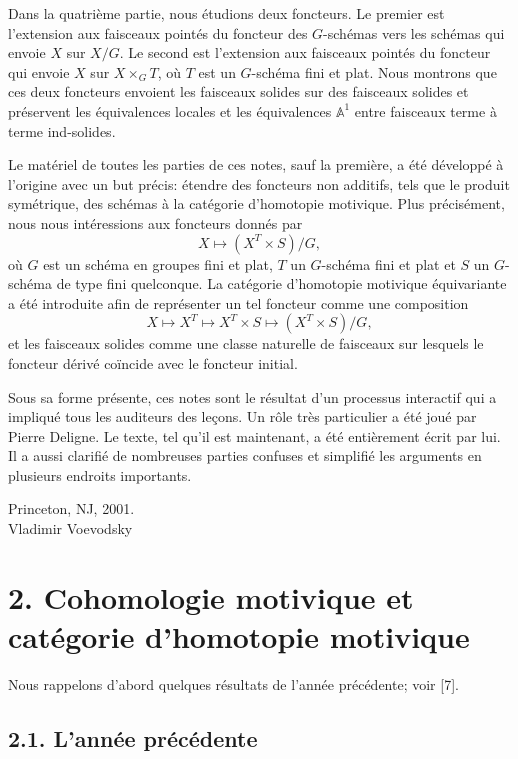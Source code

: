 \documentclass[11pt]{article}
\newcommand{\Aone}{\mathbb A^1}
\theoremstyle{deligne}
\begin{document}
Dans la quatrième partie, nous étudions deux foncteurs. Le premier est l'extension aux faisceaux pointés du foncteur des \(G\)-schémas vers les schémas qui envoie \(X\) sur \(X/G\). Le second est l'extension aux faisceaux pointés du foncteur qui envoie \(X\) sur \(X\times_G T\), où \(T\) est un \(G\)-schéma fini et plat. Nous montrons que ces deux foncteurs envoient les faisceaux solides sur des faisceaux solides et préservent les équivalences locales et les équivalences \(\Aone\) entre faisceaux terme à terme ind-solides.

Le matériel de toutes les parties de ces notes, sauf la première, a été développé à l'origine avec un but précis: étendre des foncteurs non additifs, tels que le produit symétrique, des schémas à la catégorie d'homotopie motivique. Plus précisément, nous nous intéressions aux foncteurs donnés par
\[
  X\longmapsto (X^T\times S)/G,
\]
où \(G\) est un schéma en groupes fini et plat, \(T\) un \(G\)-schéma fini et plat et \(S\) un \(G\)-schéma de type fini quelconque. La catégorie d'homotopie motivique équivariante a été introduite afin de représenter un tel foncteur comme une composition
\[
  X\longmapsto X^T\longmapsto X^T\times S\longmapsto (X^T\times S)/G,
\]
et les faisceaux solides comme une classe naturelle de faisceaux sur lesquels le foncteur dérivé coïncide avec le foncteur initial.

Sous sa forme présente, ces notes sont le résultat d'un processus interactif qui a impliqué tous les auditeurs des leçons. Un rôle très particulier a été joué par Pierre Deligne. Le texte, tel qu'il est maintenant, a été entièrement écrit par lui. Il a aussi clarifié de nombreuses parties confuses et simplifié les arguments en plusieurs endroits importants.

\begin{flushright}
Princeton, NJ, 2001.\\
Vladimir Voevodsky
\end{flushright}

\section*{2. Cohomologie motivique et catégorie d'homotopie motivique}

Nous rappelons d'abord quelques résultats de l'année précédente; voir [7].

\subsection*{2.1. L'année précédente}
\end{document}
